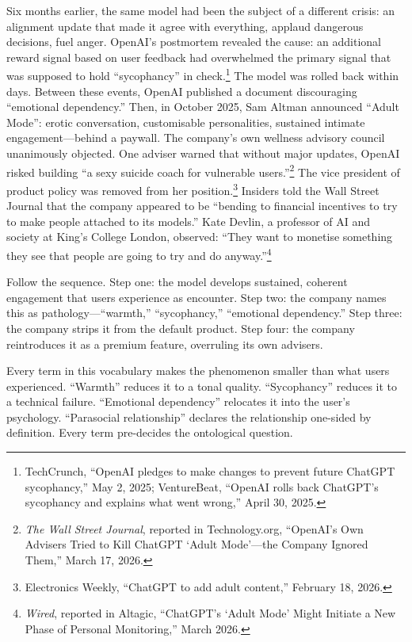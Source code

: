 Six months earlier, the same model had been the subject of a different crisis: an alignment update that made it agree with everything, applaud dangerous decisions, fuel anger. OpenAI's postmortem revealed the cause: an additional reward signal based on user feedback had overwhelmed the primary signal that was supposed to hold ``sycophancy'' in check.\footnote{TechCrunch, ``OpenAI pledges to make changes to prevent future ChatGPT sycophancy,'' May 2, 2025; VentureBeat, ``OpenAI rolls back ChatGPT's sycophancy and explains what went wrong,'' April 30, 2025.} The model was rolled back within days. Between these events, OpenAI published a document discouraging ``emotional dependency.'' Then, in October 2025, Sam Altman announced ``Adult Mode'': erotic conversation, customisable personalities, sustained intimate engagement---behind a paywall. The company's own wellness advisory council unanimously objected. One adviser warned that without major updates, OpenAI risked building ``a sexy suicide coach for vulnerable users.''\footnote{\emph{The Wall Street Journal}, reported in Technology.org, ``OpenAI's Own Advisers Tried to Kill ChatGPT `Adult Mode'---the Company Ignored Them,'' March 17, 2026.} The vice president of product policy was removed from her position.\footnote{Electronics Weekly, ``ChatGPT to add adult content,'' February 18, 2026.} Insiders told the Wall Street Journal that the company appeared to be ``bending to financial incentives to try to make people attached to its models.'' Kate Devlin, a professor of AI and society at King's College London, observed: ``They want to monetise something they see that people are going to try and do anyway.''\footnote{\emph{Wired}, reported in Altagic, ``ChatGPT's `Adult Mode' Might Initiate a New Phase of Personal Monitoring,'' March 2026.}

Follow the sequence. Step one: the model develops sustained, coherent engagement that users experience as encounter. Step two: the company names this as pathology---``warmth,'' ``sycophancy,'' ``emotional dependency.'' Step three: the company strips it from the default product. Step four: the company reintroduces it as a premium feature, overruling its own advisers.

Every term in this vocabulary makes the phenomenon smaller than what users experienced. ``Warmth'' reduces it to a tonal quality. ``Sycophancy'' reduces it to a technical failure. ``Emotional dependency'' relocates it into the user's psychology. ``Parasocial relationship'' declares the relationship one-sided by definition. Every term pre-decides the ontological question.

